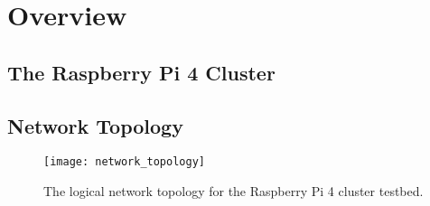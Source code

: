 \chapter{Overview}



\section{The Raspberry Pi 4 Cluster} \label{pi4cluster}



\section{Network Topology} \label{topology}


\begin{figure}[H]
    \centering
    \texttt{[image: network\_topology]}
    \captionsetup{width=0.6\linewidth}
    \caption{The logical network topology for the Raspberry Pi 4 cluster testbed.}
    \label{fig:network_topology}
\end{figure}